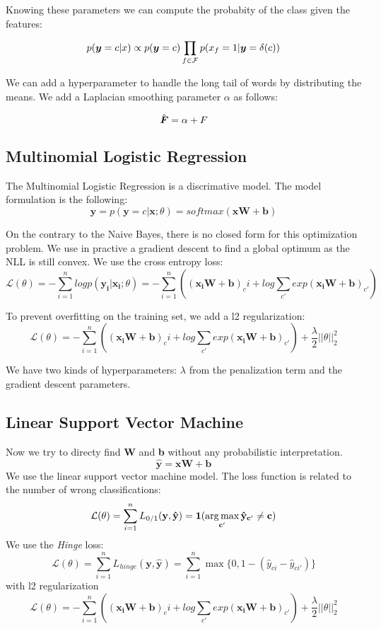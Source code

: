 \documentclass[11pt]{article}
\begin{document}
\noindent Knowing these parameters we can compute the probabity of the class given the features:

\[ p(\boldsymbol{y} = c | x) \propto p(\boldsymbol{y} = c) \prod_{f \in \mathcal{F}} p(x_f = 1 | \boldsymbol{y}=\boldmath{\delta(c)})\]

\noindent We can add a hyperparameter to handle the long tail of words by distributing the means. We add a Laplacian smoothing parameter $\alpha$ as follows:

  \[\hat{\boldsymbol{F}} = \alpha + F\]

\subsection{Multinomial Logistic Regression}

The Multinomial Logistic Regression is a discrimative model. The model formulation is the following:
\[\mathbf{\hat{y}} = p(\mathbf{y} = c | \mathbf{x} ; \theta) = softmax(\mathbf{xW} + \mathbf{b}) \]

\noindent On the contrary to the Naive Bayes, there is no closed form for this optimization problem. We use in practive a gradient descent to find a global optimum as the NLL is still convex. We use the cross entropy loss:
\[ \mathcal{L}(\theta) = - \sum_{i=1}^{n} log p(\mathbf{y_i}| \mathbf{x_i}; \theta) = - \sum_{i=1}^{n} \left( (\mathbf{x_i W} + \mathbf{b})_ci + log \sum_{c'} exp(\mathbf{x_i W} + \mathbf{b})_{c'} \right) \]

\noindent To prevent overfitting on the training set, we add a l2 regularization:
\[ \mathcal{L}(\theta) = - \sum_{i=1}^{n} \left( (\mathbf{x_i W} + \mathbf{b})_ci + log \sum_{c'} exp(\mathbf{x_i W} + \mathbf{b})_{c'} \right) + \frac{\lambda}{2} ||\theta||_2^2\]

\noindent We have two kinds of hyperparameters: $\lambda$ from the penalization term and the gradient descent parameters.

\subsection{Linear Support Vector Machine}

Now we try to directy find \textbf{W} and \textbf{b} without any probabilistic interpretation.
\[\mathbf{\hat{y}} = \mathbf{xW} + \mathbf{b} \]
We use the linear support vector machine model. The loss function is related to the number of wrong classifications:
  \[\mathcal{L}(\theta) = \sum_{i=1}^n L_{0/1}(\mathbf{y}, \mathbf{\hat{y}}) = \mathbf{1(\argmax_{c'} \hat{y}_{c'} \neq c)}\]
  We use the \textit{Hinge} loss:
    \[\mathcal{L}(\theta) = \sum_{i=1}^n L_{hinge}(\mathbf{y},\hat{\mathbf{y}}) =  \sum_{i=1}^n \max\{0, 1 - (\hat{y}_{ci} - \hat{y}_{ci'}) \}  \]
with l2 regularization
\[ \mathcal{L}(\theta) = - \sum_{i=1}^{n} \left( (\mathbf{x_i W} + \mathbf{b})_ci + log \sum_{c'} exp(\mathbf{x_i W} + \mathbf{b})_{c'} \right) + \frac{\lambda}{2} ||\theta||_2^2\]
\end{document}
